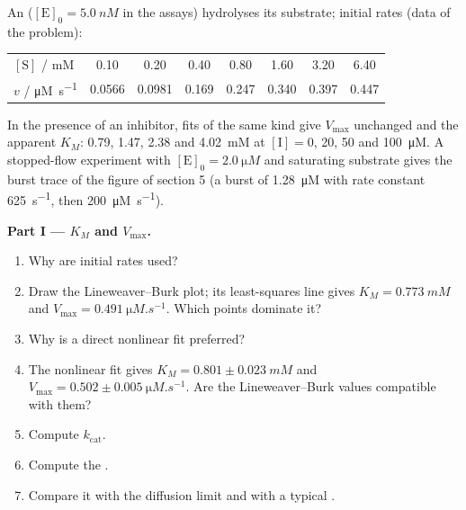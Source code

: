 \begin{problem}
\label{pb:b3:complex-kinetics:1}
An  ($[\mathrm E]_0 = \qty{5.0}{nM}$ in the assays) hydrolyses its substrate; initial rates
(data of the problem):
\begin{center}\small
\begin{tabular}{lccccccc}
\hline
$[\mathrm S]$ / mM & 0.10 & 0.20 & 0.40 & 0.80 & 1.60 & 3.20 & 6.40 \\
$v$ / \unit{\micro M.s^{-1}} & 0.0566 & 0.0981 & 0.169 & 0.247 & 0.340 & 0.397 & 0.447 \\ \hline
\end{tabular}
\end{center}
In the presence of an inhibitor, fits of the same kind give $V_{\max}$ unchanged and
the apparent $K_M$: 0.79, 1.47, 2.38 and \qty{4.02}{mM} at $[\mathrm I] = 0$, 20, 50 and
\qty{100}{\micro M}. A stopped-flow experiment with $[\mathrm E]_0 = \qty{2.0}{\micro M}$ and saturating substrate
gives the burst trace of the figure of section 5 (a burst of \qty{1.28}{\micro M}
with rate constant \qty{625}{s^{-1}}, then \qty{200}{\micro M.s^{-1}}).

\medskip\noindent\textbf{Part I --- $K_M$ and $V_{\max}$.}
\begin{enumerate}
  \item Why are initial rates used?
  \item Draw the Lineweaver--Burk plot; its least-squares line gives $K_M =
        \qty{0.773}{mM}$ and $V_{\max} = \qty{0.491}{\micro M.s^{-1}}$. Which points dominate it?
  \item Why is a direct nonlinear fit preferred?
  \item The nonlinear fit gives $K_M = 0.801 \pm \qty{0.023}{mM}$ and $V_{\max} = 0.502 \pm
        \qty{0.005}{\micro M.s^{-1}}$. Are the Lineweaver--Burk values compatible with them?
  \item Compute $k_{\mathrm{cat}}$.
  \item Compute the .
  \item Compare it with the diffusion limit and with a typical .
\end{enumerate}


\end{problem}

